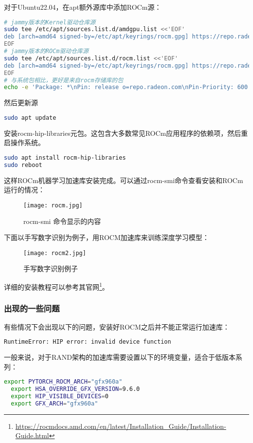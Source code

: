 \documentclass[lang=cn,a4paper,newtx]{elegantpaper}
\begin{document}
对于Ubuntu22.04，在apt额外源库中添加ROCm源：
\begin{lstlisting}[language=bash]
# jammy版本的Kernel驱动仓库源
sudo tee /etc/apt/sources.list.d/amdgpu.list <<'EOF'
deb [arch=amd64 signed-by=/etc/apt/keyrings/rocm.gpg] https://repo.radeon.com/amdgpu/5.7.1/ubuntu jammy main
EOF
# jammy版本的ROCm驱动仓库源
sudo tee /etc/apt/sources.list.d/rocm.list <<'EOF'
deb [arch=amd64 signed-by=/etc/apt/keyrings/rocm.gpg] https://repo.radeon.com/rocm/apt/debian jammy main
EOF
# 与系统包相比，更好是来自rocm存储库的包
echo -e 'Package: *\nPin: release o=repo.radeon.com\nPin-Priority: 600' | sudo tee /etc/apt/preferences.d/rocm-pin-600
\end{lstlisting} 

然后更新源
\begin{lstlisting}[language=bash]
sudo apt update
\end{lstlisting}

安装rocm-hip-libraries元包。这包含大多数常见ROCm应用程序的依赖项，然后重启操作系统。
\begin{lstlisting}[language=bash]
sudo apt install rocm-hip-libraries
sudo reboot
\end{lstlisting}

这样ROCm机器学习加速库安装完成。可以通过rocm-smi命令查看安装和ROCm运行的情况：
\begin{figure}[hbpt]
  \centering
  \texttt{[image: rocm.jpg]}
  \caption{rocm-smi 命令显示的内容}
  \label{fig:ubuntu-rocm-smi}
\end{figure}

下面以手写数字识别为例子，用ROCM加速库来训练深度学习模型：
\begin{figure}[hbpt]
  \centering
  \texttt{[image: rocm2.jpg]}
  \caption{手写数字识别例子}
  \label{fig:ubuntu-mnist}
\end{figure}

详细的安装教程可以参考其官网\footnote{\url{https://rocmdocs.amd.com/en/latest/Installation_Guide/Installation-Guide.html}}。
\subsubsection{出现的一些问题}
有些情况下会出现以下的问题，安装好ROCM之后并不能正常运行加速库：
\begin{lstlisting}[language=bash]
  RuntimeError: HIP error: invalid device function
\end{lstlisting}

一般来说，对于RAND架构的加速库需要设置以下的环境变量，适合于低版本系列：
\begin{lstlisting}[language=bash]
  export PYTORCH_ROCM_ARCH="gfx960a"
  export HSA_OVERRIDE_GFX_VERSION=9.6.0
  export HIP_VISIBLE_DEVICES=0
  export GFX_ARCH="gfx960a"
\end{lstlisting}
\end{document}
